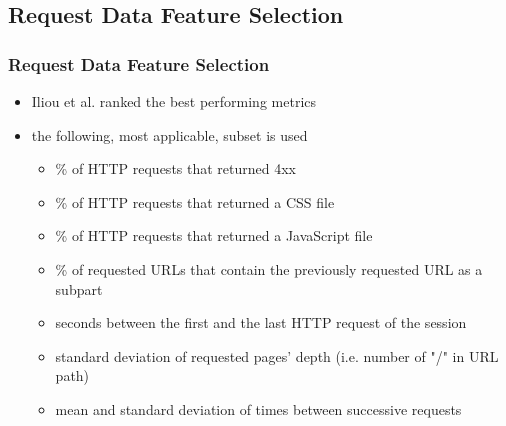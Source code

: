 \documentclass[t,aspectratio=169,table]{beamer}
\begin{document}
\subsection{Request Data Feature Selection}
\begin{frame}
\frametitle{Request Data Feature Selection}

\begin{itemize}
    \item Iliou et al. \cite{10.1145/3339252.3339267} ranked the best performing metrics
    \item the following, most applicable, subset is used
    \begin{itemize}
        \item \% of HTTP requests that returned 4xx
        \item \% of HTTP requests that returned a CSS file
        \item \% of HTTP requests that returned a JavaScript file
        \item \% of requested URLs that contain the previously requested URL as a subpart
        \item seconds between the first and the last HTTP request of the session
        \item standard deviation of requested pages' depth (i.e. number of "/" in URL path)
        \item mean and standard deviation of times between successive requests
    \end{itemize}
\end{itemize}

\end{frame}
\end{document}
